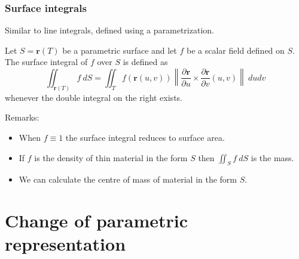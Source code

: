 \documentclass[aspectratio=169]{beamer}
\newcommand{\norm}[1]{\left\|#1\right\|} %
\newcommand{\rr}{\mathbf{r}}
\begin{document}
\begin{frame}
    \frametitle{Surface integrals}

    Similar to line integrals, defined using a parametrization.

    \begin{definition}
        Let \(S = \rr(T)\) be a parametric surface and let \(f\) be a scalar field defined on \(S\).
        The surface integral of \(f\) over \(S\) is defined as
        \[
            \iint_{\rr(T)} f \ dS
            = \iint_{T} f(\rr(u,v))  \norm{\frac{\partial \rr}{\partial u} \times \frac{\partial \rr}{\partial v}(u,v)} \ du dv
        \]
        whenever the double integral on the right exists.
    \end{definition}

    \begin{block}{Remarks:}
        \begin{itemize}
            \item When \(f \equiv 1\) the surface integral reduces to surface area.
            \item If \(f\) is the density of thin material in the form \(S\) then \(\iint_{S} f \ dS\) is the  mass.
            \item We can calculate the centre of mass of material in the form \(S\).
        \end{itemize}

    \end{block}
\end{frame}

\section{Change of parametric representation}
\end{document}
